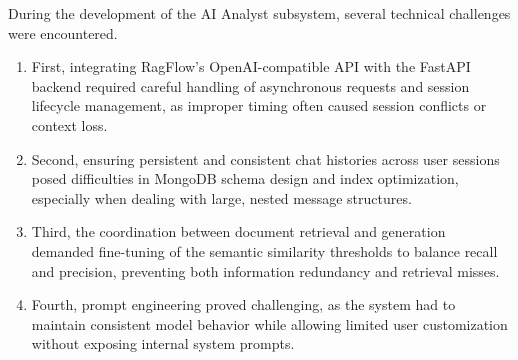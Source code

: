 During the development of the AI Analyst subsystem, several technical challenges were encountered.
\begin{enumerate}
    \item First, integrating RagFlow’s OpenAI-compatible API with the FastAPI backend required careful handling of asynchronous requests and session lifecycle management, as improper timing often caused session conflicts or context loss.
    \item Second, ensuring persistent and consistent chat histories across user sessions posed difficulties in MongoDB schema design and index optimization, especially when dealing with large, nested message structures.
    \item Third, the coordination between document retrieval and generation demanded fine-tuning of the semantic similarity thresholds to balance recall and precision, preventing both information redundancy and retrieval misses.
    \item Fourth, prompt engineering proved challenging, as the system had to maintain consistent model behavior while allowing limited user customization without exposing internal system prompts.
\end{enumerate}

